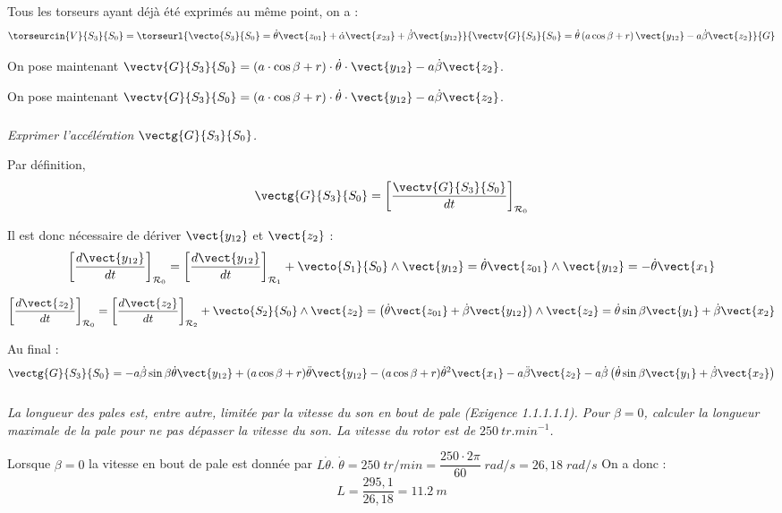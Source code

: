 \begin{multicols}{2}
\begin{corrige}
Tous les torseurs ayant déjà été exprimés au même point, on a :
$$
\torseurcin{V}{S_3}{S_0} = 
\torseurl{
\vecto{S_3}{S_0}=\dot{\theta}\vect{z_{01}}+\dot{\alpha}\vect{x_{23}}
+\dot{\beta}\vect{y_{12}}
}{%
\vectv{G}{S_3}{S_0}
=\dot{\theta}\left(a\cos\beta+r\right)\vect{y_{12}}-a\dot{\beta}\vect{z_{2}}}{G}
$$

On pose maintenant $\vectv{G}{S_3}{S_0}=(a \cdot \cos \beta + r) \cdot \dot{\theta} \cdot \vect{y_{12}}-a\dot{\beta}\vect{z_2}$.
\end{corrige}\else \fi


On pose maintenant $\vectv{G}{S_3}{S_0}=(a \cdot \cos \beta + r) \cdot \dot{\theta} \cdot \vect{y_{12}}-a\dot{\beta}\vect{z_2}$.

\subparagraph{}
\textit{Exprimer l'accélération $\vectg{G}{S_3}{S_0}$.}
\ifprof
\begin{corrige}
Par définition, 
$$
\vectg{G}{S_3}{S_0} = 
\left[
\dfrac{\vectv{G}{S_3}{S_0}}{dt}
\right]_{\mathcal{R}_0}
$$

Il est donc nécessaire de dériver $\vect{y_{12}}$ et $\vect{z_{2}}$ :
$$
\left[
\dfrac{d\vect{y_{12}}}{dt}
\right]_{\mathcal{R}_0}
=
\left[
\dfrac{d\vect{y_{12}}}{dt}
\right]_{\mathcal{R}_1}+\vecto{S_1}{S_0} \wedge \vect{y_{12}}
=\dot{\theta}\vect{z_{01}} \wedge \vect{y_{12}}
=-\dot{\theta}\vect{x_{1}}
$$

$$
\left[
\dfrac{d\vect{z_{2}}}{dt}
\right]_{\mathcal{R}_0}
=
\left[
\dfrac{d\vect{z_{2}}}{dt}
\right]_{\mathcal{R}_2}+\vecto{S_2}{S_0} \wedge \vect{z_{2}}
=\left(
\dot{\theta}\vect{z_{01}}+\dot{\beta}\vect{y_{12}}
\right) \wedge \vect{z_{2}}
=
\dot{\theta}\sin\beta\vect{y_1}
+\dot{\beta}\vect{x_{2}}
$$

Au final :
$$
\vectg{G}{S_3}{S_0} = 
-a \dot{\beta} \sin \beta \dot{\theta} \vect{y_{12}}
+(a \cos \beta + r) \ddot{\theta} \vect{y_{12}}
-(a \cos \beta + r) \dot{\theta}^2 \vect{x_{1}}
-a\ddot{\beta}\vect{z_2}
-a\dot{\beta}\left( \dot{\theta}\sin\beta\vect{y_1}
+\dot{\beta}\vect{x_{2}}\right)
$$
\end{corrige}\else \fi

\subparagraph{}
\textit{La longueur des pales est, entre autre, limitée par la vitesse du son en bout de pale (Exigence 1.1.1.1.1). Pour $\beta=0$, calculer la longueur maximale de la pale pour ne pas dépasser la vitesse du son. La vitesse du rotor est de $\SI{250}{tr.min^{-1}}$.}
\ifprof
\begin{corrige}
Lorsque $\beta=0$ la vitesse en bout de pale est donnée par $L\dot{\theta}$.
$\dot{\theta}=250 \; tr/min = \dfrac{250 \cdot 2 \pi}{60}\;rad/s = 26,18\;rad/s$
On a donc :
$$
L = \dfrac{295,1}{26,18} =\SI{11,2}{m}
$$
\end{corrige}\else \fi


\end{multicols}
